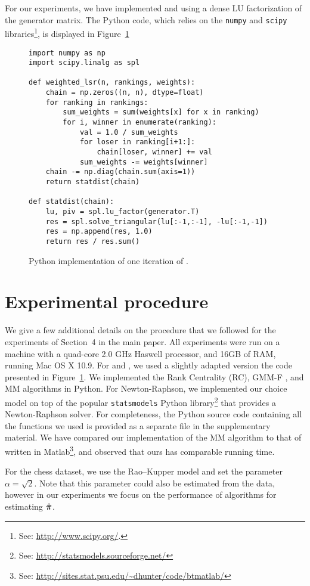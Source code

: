 For our experiments, we have implemented \LSR{} and \ILSR{} using a dense LU factorization of the generator matrix.
The Python code, which relies on the \texttt{numpy} and \texttt{scipy} libraries\footnote{
See: \url{http://www.scipy.org/}.
}, is displayed in Figure~\ref{fix:lst:implementation}

\begin{figure}
\begin{lstlisting}
import numpy as np
import scipy.linalg as spl

def weighted_lsr(n, rankings, weights):
    chain = np.zeros((n, n), dtype=float)
    for ranking in rankings:
        sum_weights = sum(weights[x] for x in ranking)
        for i, winner in enumerate(ranking):
            val = 1.0 / sum_weights
            for loser in ranking[i+1:]:
                chain[loser, winner] += val
            sum_weights -= weights[winner]
    chain -= np.diag(chain.sum(axis=1))
    return statdist(chain)

def statdist(chain):
    lu, piv = spl.lu_factor(generator.T)
    res = spl.solve_triangular(lu[:-1,:-1], -lu[:-1,-1])
    res = np.append(res, 1.0)
    return res / res.sum()
\end{lstlisting}
\caption{
Python implementation of one iteration of \ILSR{}.
}
\label{fix:lst:implementation}
\end{figure}

\section{Experimental procedure}

We give a few additional details on the procedure that we followed for the experiments of Section~4 in the main paper.
All experiments were run on a machine with a quad-core 2.0 GHz Haswell processor, and 16GB of RAM, running Mac OS X 10.9.
For \LSR{} and \ILSR{}, we used a slightly adapted version the code presented in Figure~\ref{fix:lst:implementation}.
We implemented the Rank Centrality (RC), GMM-F \citep{azari2013generalized}, and MM \citep{hunter2004mm} algorithms in Python.
For Newton-Raphson, we implemented our choice model on top of the popular \texttt{statsmodels} Python library\footnote{
See: \url{http://statsmodels.sourceforge.net/}
} that provides a Newton-Raphson solver.
For completeness, the Python source code containing all the functions we used is provided as a separate file in the supplementary material.
We have compared our implementation of the MM algorithm to that of \citeauthor{hunter2004mm} written in Matlab\footnote{
See: \url{http://sites.stat.psu.edu/~dhunter/code/btmatlab/}
}, and observed that ours has comparable running time.

For the chess dataset, we use the Rao--Kupper model and set the parameter $\alpha = \sqrt{2}$.
Note that this parameter could also be estimated from the data, however in our experiments we focus on the performance of algorithms for estimating $\hat{\bm{\pi}}$.
